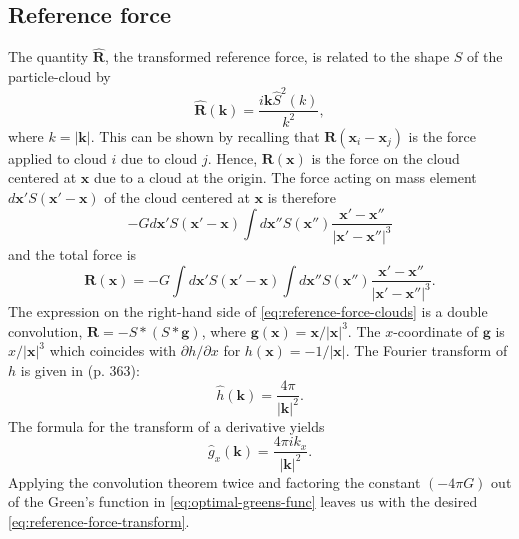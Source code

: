 \subsection{Reference force}
The quantity $\mathbf{\hat{R}}$, the transformed reference force, is related to the shape $S$ of the particle-cloud by
\begin{equation}\label{eq:reference-force-transform}
    \mathbf{\hat{R}}(\mathbf{k}) = \frac{i\mathbf{k}\hat{S}^2(k)}{k^2},
\end{equation}
where $k = |\mathbf{k}|$.
This can be shown by recalling that $\mathbf{R}(\mathbf{x}_i - \mathbf{x}_j)$ is the force applied to cloud $i$ due to cloud $j$.
Hence, $\mathbf{R}(\mathbf{x})$ is the force on the cloud centered at $\mathbf{x}$ due to a cloud at the origin.
The force acting on mass element $d\mathbf{x}' S(\mathbf{x}' - \mathbf{x})$ of the cloud centered at $\mathbf{x}$ is therefore
\begin{equation*}
    -G d\mathbf{x}'S(\mathbf{x}' - \mathbf{x}) \int d\mathbf{x}'' S(\mathbf{x}'')\frac{\mathbf{x}' - \mathbf{x}''}{|\mathbf{x}' - \mathbf{x}''|^3}
\end{equation*}
and the total force is
\begin{equation}\label{eq:reference-force-clouds}
    \mathbf{R}(\mathbf{x}) = -G \int d\mathbf{x}'S(\mathbf{x}' - \mathbf{x}) \int d\mathbf{x}'' S(\mathbf{x}'')\frac{\mathbf{x}' - \mathbf{x}''}{|\mathbf{x}' - \mathbf{x}''|^3}.
\end{equation}
The expression on the right-hand side of \autoref{eq:reference-force-clouds} is a double convolution, $\mathbf{R} = -S * (S * \mathbf{g})$, where $\mathbf{g}(\mathbf{x}) = \mathbf{x}/|\mathbf{x}|^3.$
The $x$-coordinate of $\mathbf{g}$ is $x/|\mathbf{x}|^3$ which coincides with $\partial h / \partial x$ for $h(\mathbf{x}) = -1/|\mathbf{x}|.$
The Fourier transform of $h$ is given in \cite{gelfand1964generalized} (p. 363):
\begin{equation*}
    \hat{h}(\mathbf{k}) = \frac{4\pi}{|\mathbf{k}|^2}.
\end{equation*}
The formula for the transform of a derivative yields
\begin{equation*}
    \hat{g}_x(\mathbf{k}) = \frac{4\pi i k_x}{|\mathbf{k}|^2}.
\end{equation*}
Applying the convolution theorem twice and factoring the constant $(-4\pi G)$ out of the Green's function in \autoref{eq:optimal-greens-func} leaves us with the desired \autoref{eq:reference-force-transform}.

